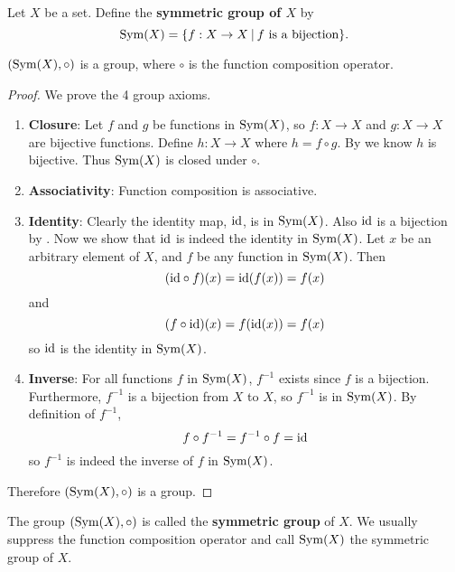 \begin{definition}
    Let $X$ be a set. Define the \textbf{symmetric group of $X$} by
    \[
        \Sym{X} = \{f: X \to X \vert f \text{ is a bijection}\}.
    \]
\end{definition}
\begin{proposition}
    $(\mathrm{Sym}(X), \circ)$ is a group, where $\circ$ is the function composition operator.
\end{proposition}
\begin{proof}
    We prove the 4 group axioms.
    \begin{enumerate}
        \item \textbf{Closure}: Let $f$ and $g$ be functions in $\mathrm{Sym}(X)$, so $f: X\to X$ and $g:X \to X$ are bijective functions. Define $h:X \to X$ where $h = f\circ g$. By  we know $h$ is bijective. Thus $\mathrm{Sym}(X)$ is closed under $\circ$.
        
        \item \textbf{Associativity}: Function composition is associative.
        
        \item \textbf{Identity}: Clearly the identity map, $\mathrm{id}$, is in $\mathrm{Sym}(X)$. Also $\mathrm{id}$ is a bijection by . Now we show that $\mathrm{id}$ is indeed the identity in $\mathrm{Sym}(X)$. Let $x$ be an arbitrary element of $X$, and $f$ be any function in $\mathrm{Sym}(X)$. Then
        \[
            (\mathrm{id} \circ f)(x) = \mathrm{id}(f(x)) = f(x)
        \]
        and
        \[
            (f \circ \mathrm{id})(x) = f(\mathrm{id}(x)) = f(x)
        \]
        so $\mathrm{id}$ is the identity in $\mathrm{Sym}(X)$.
        
        \item \textbf{Inverse}: For all functions $f$ in $\mathrm{Sym}(X)$, $f^{-1}$ exists since $f$ is a bijection. Furthermore, $f^{-1}$ is a bijection from $X$ to $X$, so $f^{-1}$ is in $\mathrm{Sym}(X)$. By definition of $f^{-1}$,
        \[
            f \circ f^{-1} = f^{-1} \circ f = \mathrm{id}
        \]
        so $f^{-1}$ is indeed the inverse of $f$ in $\mathrm{Sym}(X)$.
    \end{enumerate}
    Therefore $(\mathrm{Sym}(X), \circ)$ is a group.
\end{proof}

The group $(\mathrm{Sym}(X), \circ)$ is called the \textbf{symmetric group} of $X$. We usually suppress the function composition operator and call $\mathrm{Sym}(X)$ the symmetric group of $X$.

